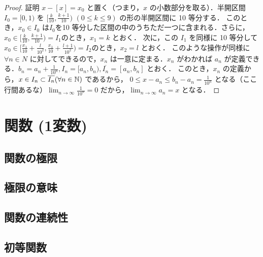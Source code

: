 \documentclass[a4paper]{ltjsarticle}
\begin{document}
  \begin{proof}{証明}{}
   $x - [x] = x_0$ と置く（つまり，$x$ の小数部分を取る）．半開区間 $I_0 = [0, 1)$ を $[\frac{k}{10},\frac{k + 1}{10})$ \hspace{10pt} $(0 \leq k \leq 9)$ の形の半開区間に 10 等分する．
   このとき，$x_0 \in I_0$ は$I_0$を10 等分した区間の中のうちただ一つに含まれる．さらに，$x_0 \in [\frac{k}{10}, \frac{k + 1}{10}) = I_1 のとき，x_1 = k$ とおく．
   次に，この $I_1$ を同様に 10 等分して $x_0 \in [\frac{x_1}{10} + \frac{l}{10^2}, \frac{x_1}{10} + \frac{l + 1}{10^2}) = I_2 のとき，x_2 = l$ とおく．
   このような操作が同様に $\forall n \in N$ に対してできるので，$x_n$ は一意に定まる．$x_n$ がわかれば $a_n$ が定義できる．$b_n = a_n + \frac{1}{10^n}, I_n = [a_n, b_n), \overline{I_n} = [a_n, b_n]$ とおく．
   このとき，$x_n$ の定義から，$x \in I_n \subset \overline{I_n} (\forall n \in \mathbb{N})$ であるから，
   $0 \leq x - a_n \leq b_n - a_n = \frac{1}{10^n}$ となる（ここ行間あるな）$\displaystyle \lim_{n \to \infty} \frac{1}{10^n} = 0$ だから，$\displaystyle \lim_{n \to \infty} a_n = x$ となる．
  \end{proof}

 \section{関数 (1変数)}
  \subsection{関数の極限}
  \subsection{極限の意味}
  \subsection{関数の連続性}
  \subsection{初等関数}
\end{document}
